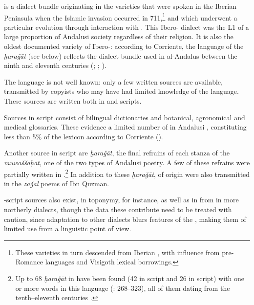 \documentclass[output=paper,modfonts,nonflat]{langsci/langscibook}
\begin{document}
 is a dialect bundle originating in the  varieties that were spoken in the Iberian Peninsula when the Islamic invasion occurred in 711,\footnote{These varieties in turn descended from Iberian  , with  influence from pre-{Romance}  languages and Visigoth lexical borrowings.} and  which underwent a particular evolution through interaction with . This Ibero- dialect was the L1 of a large proportion of Andalusi society regardless of their religion. It is also the oldest documented variety of Ibero-: according to Corriente, the language of the \textit{ḫaraǧāt} (see below) reflects the  dialect bundle used in al-Andalus between the ninth and eleventh centuries (\citealt{Corriente1995}; \citeyear{Corriente1997poetry}; \citeyear{Corriente2000}). 

The language is not well known: only a few written sources are available, transmitted by copyists who may have had limited knowledge of the language. These sources are written both in  and  scripts. 

Sources in  script consist of bilingual dictionaries and botanical, agronomical and medical glossaries. These evidence a limited number of   in Andalusi , constituting less than 5\% of the lexicon according to Corriente (\citeyear[142]{Corriente1992book}).

Another source in  script are \textit{ḫaraǧāt}, the final refrains of each stanza of the \textit{muwaššaḥāt}, one of the two types of Andalusi  poetry. A few of these refrains were partially written in .\footnote{Up to 68 \textit{ḫaraǧāt} in  have been found (42 in  script and 26 in  script) with one or more words in this language (\citealt{Corriente1997poetry}: 268–323), all of them dating from the tenth--eleventh centuries \citep[343]{Corriente1997poetry}.} In addition to these \textit{ḫaraǧāt},  of  origin were also transmitted in the \textit{zaǧal} poems of Ibn Quzman. 

-script sources also exist, in toponymy, for instance, as well as in  from  in more northerly  dialects, though the data these contribute need to be treated with caution, since adaptation to other  dialects blurs features of the , making them of limited use from a linguistic point of view. 
\end{document}
